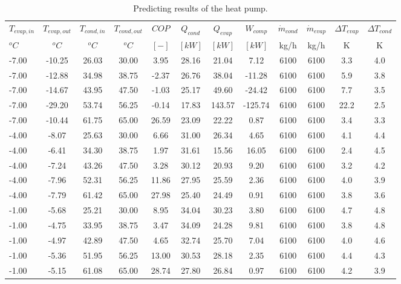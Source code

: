 \documentclass[english]{SPFShortReport}
\begin{document}
\begin{table}[!ht]
\begin{small}
\caption{Predicting results of the heat pump.}
\begin{center}
\resizebox{12cm}{!} 
{
\begin{tabular}{l | c c c c c c c c c c c } 
\hline
\hline
$T_{evap,in}$ &$T_{evap,out}$ &$T_{cond,in}$ &$T_{cond,out}$ &$COP$ &$Q_{cond}$ &$Q_{evap}$ &$W_{comp}$ &$\dot m_{cond}$ &$\dot m_{evap}$ &$\Delta T_{evap}$ &$\Delta T_{cond}$ \\ 
$^oC$ &$^oC$ &$^oC$ &$^oC$ &$[-]$ &$[kW]$ &$[kW]$ &$[kW]$ &kg/h &kg/h &K &K\\ 
\hline
-7.00 & -10.25 & 26.03 & 30.00 & 3.95 & 28.16 & 21.04 & 7.12 & 6100 & 6100 & 3.3 & 4.0\\ 
-7.00 & -12.88 & 34.98 & 38.75 & -2.37 & 26.76 & 38.04 & -11.28 & 6100 & 6100 & 5.9 & 3.8\\ 
-7.00 & -14.67 & 43.95 & 47.50 & -1.03 & 25.17 & 49.60 & -24.42 & 6100 & 6100 & 7.7 & 3.5\\ 
-7.00 & -29.20 & 53.74 & 56.25 & -0.14 & 17.83 & 143.57 & -125.74 & 6100 & 6100 & 22.2 & 2.5\\ 
-7.00 & -10.44 & 61.75 & 65.00 & 26.59 & 23.09 & 22.22 & 0.87 & 6100 & 6100 & 3.4 & 3.3\\ 
-4.00 & -8.07 & 25.63 & 30.00 & 6.66 & 31.00 & 26.34 & 4.65 & 6100 & 6100 & 4.1 & 4.4\\ 
-4.00 & -6.41 & 34.30 & 38.75 & 1.97 & 31.61 & 15.56 & 16.05 & 6100 & 6100 & 2.4 & 4.5\\ 
-4.00 & -7.24 & 43.26 & 47.50 & 3.28 & 30.12 & 20.93 & 9.20 & 6100 & 6100 & 3.2 & 4.2\\ 
-4.00 & -7.96 & 52.31 & 56.25 & 11.86 & 27.95 & 25.59 & 2.36 & 6100 & 6100 & 4.0 & 3.9\\ 
-4.00 & -7.79 & 61.42 & 65.00 & 27.98 & 25.40 & 24.49 & 0.91 & 6100 & 6100 & 3.8 & 3.6\\ 
-1.00 & -5.68 & 25.21 & 30.00 & 8.95 & 34.04 & 30.23 & 3.80 & 6100 & 6100 & 4.7 & 4.8\\ 
-1.00 & -4.75 & 33.95 & 38.75 & 3.47 & 34.09 & 24.28 & 9.81 & 6100 & 6100 & 3.8 & 4.8\\ 
-1.00 & -4.97 & 42.89 & 47.50 & 4.65 & 32.74 & 25.70 & 7.04 & 6100 & 6100 & 4.0 & 4.6\\ 
-1.00 & -5.36 & 51.95 & 56.25 & 13.00 & 30.53 & 28.18 & 2.35 & 6100 & 6100 & 4.4 & 4.3\\ 
-1.00 & -5.15 & 61.08 & 65.00 & 28.74 & 27.80 & 26.84 & 0.97 & 6100 & 6100 & 4.2 & 3.9\\ 

\end{tabular}}
\end{center}
\end{small}
\end{table}
\end{document}
